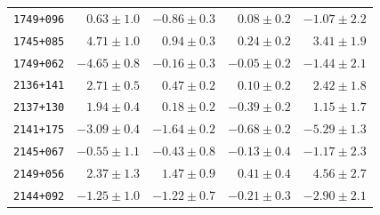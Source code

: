 \begin{table}
{\begin{tabular}{|c|r|r|r|r|}
\texttt{1749+096} & $0.63\pm 1.0$ & $-0.86\pm 0.3$ & $0.08\pm 0.2$ & $-1.07 \pm 2.2$ \\
\texttt{1745+085} & $4.71\pm 1.0$ & $0.94\pm 0.3$ & $0.24\pm 0.2$ & $3.41 \pm 1.9$ \\
\texttt{1749+062} & $-4.65\pm 0.8$ & $-0.16\pm 0.3$ & $-0.05\pm 0.2$ & $-1.44 \pm 2.1$ \\
\texttt{2136+141} & $2.71\pm 0.5$ & $0.47\pm 0.2$ & $0.10\pm 0.2$ & $2.42 \pm 1.8$ \\
\texttt{2137+130} & $1.94\pm 0.4$ & $0.18\pm 0.2$ & $-0.39\pm 0.2$ & $1.15 \pm 1.7$ \\
\texttt{2141+175} & $-3.09\pm 0.4$ & $-1.64\pm 0.2$ & $-0.68\pm 0.2$ & $-5.29 \pm 1.3$ \\
\texttt{2145+067} & $-0.55\pm 1.1$ & $-0.43\pm 0.8$ & $-0.13\pm 0.4$ & $-1.17 \pm 2.3$ \\
\texttt{2149+056} & $2.37\pm 1.3$ & $1.47\pm 0.9$ & $0.41\pm 0.4$ & $4.56 \pm 2.7$ \\
\texttt{2144+092} & $-1.25\pm 1.0$ & $-1.22\pm 0.7$ & $-0.21\pm 0.3$ & $-2.90 \pm 2.1$ \\
\hline
 \end{tabular}
}
\end{table}

